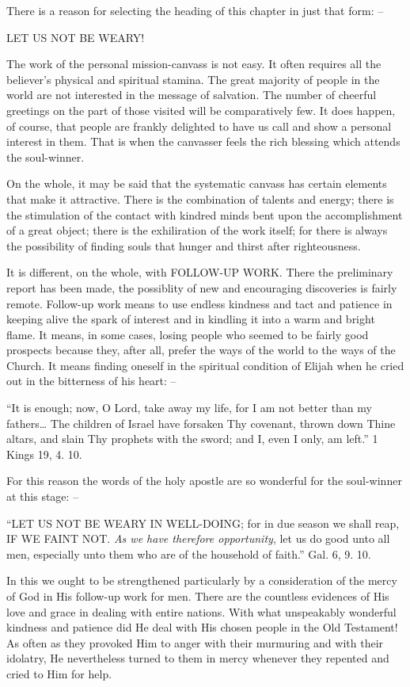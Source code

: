 \documentclass[
]{book}
\begin{document}
There is a reason for selecting the heading of this chapter in just that form: --

LET US NOT BE WEARY!

The work of the personal mission-canvass is not easy. It often requires all the believer's physical and spiritual stamina. The great majority of people in the world are not interested in the message of salvation. The number of cheerful greetings on the part of those visited will be comparatively few. It does happen, of course, that people are frankly delighted to have us call and show a personal interest in them. That is when the canvasser feels the rich blessing which attends the soul-winner.

On the whole, it may be said that the systematic canvass has certain elements that make it attractive. There is the combination of talents and energy; there is the stimulation of the contact with kindred minds bent upon the accomplishment of a great object; there is the exhiliration of the work itself; for there is always the possibility of finding souls that hunger and thirst after righteousness.

It is different, on the whole, with FOLLOW-UP WORK. There the preliminary report has been made, the possiblity of new and encouraging discoveries is fairly remote. Follow-up work means to use endless kindness and tact and patience in keeping alive the spark of interest and in kindling it into a warm and bright flame. It means, in some cases, losing people who seemed to be fairly good prospects because they, after all, prefer the ways of the world to the ways of the Church. It means finding oneself in the spiritual condition of Elijah when he cried out in the bitterness of his heart: --

``It is enough; now, O Lord, take away my life, for I am not better than my fathers\ldots{} The children of Israel have forsaken Thy covenant, thrown down Thine altars, and slain Thy prophets with the sword; and I, even I only, am left.'' 1 Kings 19, 4. 10.

For this reason the words of the holy apostle are so wonderful for the soul-winner at this stage: --

``LET US NOT BE WEARY IN WELL-DOING; for in due season we shall reap, IF WE FAINT NOT. \emph{As we have therefore opportunity}, let us do good unto all men, especially unto them who are of the household of faith.'' Gal. 6, 9. 10.

In this we ought to be strengthened particularly by a consideration of the mercy of God in His follow-up work for men. There are the countless evidences of His love and grace in dealing with entire nations. With what unspeakably wonderful kindness and patience did He deal with His chosen people in the Old Testament! As often as they provoked Him to anger with their murmuring and with their idolatry, He nevertheless turned to them in mercy whenever they repented and cried to Him for help.
\end{document}
